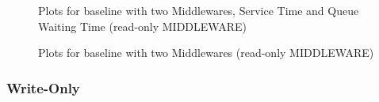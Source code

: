 \documentclass[11pt,a4paper]{article}
\begin{document}
\begin{figure}[!h]
  \centering
    \caption{Plots for baseline with two Middlewares, Service Time and Queue Waiting Time (read-only MIDDLEWARE)}
  \label{fig:baseline_mw_2_mw_mw_c_ro}
\end{figure}

\begin{figure}[!h]
  \centering
    \caption{Plots for baseline with two Middlewares (read-only MIDDLEWARE)}
  \label{fig:baseline_mw_2_mw_mw_ro}
\end{figure}

\subsubsection*{Write-Only}
\end{document}
